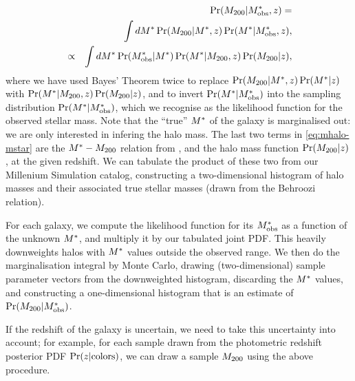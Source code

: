 \documentclass[useAMS,usenatbib]{mn2e}
\begin{document}
\begin{eqnarray}
&& \Pr(M_{200}|M^{*}_{\rm obs},z) = \notag\\
&& \int dM^{*} \Pr(M_{200}|M^{*},z) \Pr(M^{*}|M^{*}_{\rm obs},z), \notag\\
&\propto& \int dM^{*} \Pr(M^{*}_{\rm obs}|M^{*}) \Pr(M^{*}|M_{200},z) \Pr(M_{200}|z),
\label{eq:mhalo-mstar}
\end{eqnarray}
where we have used Bayes' Theorem twice to replace
$\Pr(M_{200}|M^{*},z) \Pr(M^{*}|z)$ with 
$\Pr(M^{*}|M_{200},z) \Pr(M_{200}|z)$, and 
to invert $\Pr(M^{*}|M^{*}_{\rm obs})$ into the sampling
distribution $\Pr(M^{*}|M^{*}_{\rm obs})$, which we recognise as the likelihood
function for the observed stellar mass. Note that the ``true'' $M^{*}$ of the
galaxy is marginalised out: we are only interested in infering the halo
mass. The last two terms in
\eqref{eq:mhalo-mstar} are the $M^{*}-M_{200}$ relation from
\citet{BehrooziEtal2010}, and the halo mass function $\Pr(M_{200}|z)$, at the
given redshift. We can
tabulate the product of these two from our Millenium Simulation catalog,
constructing a two-dimensional histogram of halo masses and their associated
true stellar masses (drawn from the Behroozi relation). 

For each galaxy, we compute the likelihood function for its $M^{*}_{\rm obs}$ as a
function of the unknown $M^{*}$, and multiply it by our tabulated joint PDF.
This heavily downweights halos with $M^{*}$ values outside the observed
range. We then do the marginalisation integral by Monte Carlo, drawing
(two-dimensional) sample parameter vectors
from the downweighted histogram, discarding the $M^{*}$ values, and
constructing a one-dimensional histogram that is an estimate of
$\Pr(M_{200}|M^{*}_{\rm obs})$.

If the redshift of the galaxy is uncertain, we need to take this uncertainty
into account; for example, for each sample drawn from the photometric redshift
posterior PDF $\Pr(z|{\rm colors})$, we can draw a sample $M_{200}$ using the
above procedure.



% 

% 
% 




\label{lastpage}
\bsp
\end{document}
